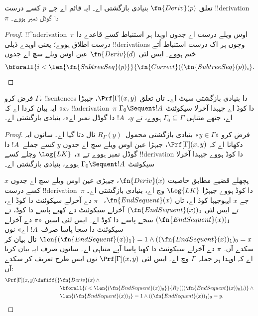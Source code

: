 \documentclass[../../../include/open-logic-section]{subfiles}
\begin{document}
\begin{prop}
تعلق $\fn{Deriv}(p)$ بنیادی بازگشتی اے۔ ایہ قائم اے جے $p$
کسے درست !!{derivation}~$\pi$ دا گوڈل نمبر ہووے۔
\end{prop}

\begin{proof}
!!^a{derivation}~$\pi$
اوس ویلے درست اے
جدوں اوہدا ہر استنباط کسے قاعدے
دا درست اطلاق
ہووے؛ یعنی اوہدے ذیلی !!{derivation}s
وچوں ہر اک
درست استنباط اُتے
ختم ہووے۔ ایس لئی
$\fn{Deriv}(d)$
عین اوس ویلے سچ
اے جدوں
\[
\bforall{i<\len{\fn{SubtreeSeq}(p)}}{\fn{Correct}((\fn{SubtreeSeq}(p))_i}.
\]
\end{proof}

\begin{prop}
فرض کرو $\Gamma$،
!!{sentence}s دا
بنیادی بازگشتی
سیٹ اے۔ تاں تعلق
$\Prf[\Gamma](x, y)$،
جیہڑا ایہ بیان
کردا اے کہ
«$x$،
!!a{derivation}~$\pi$
دا کوڈ اے جیہدا
آخرلا سیکوئنٹ
$\Gamma_0 \Sequent !A$
اے، جتھے متناہی $\Gamma_0 \subseteq \Gamma$
ہووے، تے
$y$،~$!A$ دا
گوڈل نمبر اے»،
بنیادی بازگشتی
اے۔
\end{prop}

\begin{proof}
فرض کرو
«$y \in \Gamma$»
بنیادی بازگشتی
محمول~$R_\Gamma(y)$
نال دتا گیا اے۔
سانوں ایہ دکھانا
اے کہ
$\Prf[\Gamma](x, y)$،
جیہڑا عین اوس
ویلے سچ اے جدوں
$y$ کسے
جملے~$!A$ دا
گوڈل نمبر ہووے
تے $x$، $\Log{LK}$ وچلے کسے !!{derivation} دا کوڈ ہووے جیہدا
آخرلا سیکوئنٹ
$\Gamma_0 \Sequent !A$
ہووے،
بنیادی بازگشتی
اے۔

پچھلے قضیے مطابق خاصیت
$\fn{Deriv}(x)$،
جیہڑی عین اوس
ویلے سچ اے جدوں
$x$ کسے درست
!!{derivation}~$\pi$
دا کوڈ ہووے
جیہڑا $\Log{LK}$
وچ اے،
بنیادی بازگشتی
اے۔ جے $x$
ایہوجیہا کوڈ
اے، تاں
$\fn{EndSequent}(x)$،
~$\pi$ دے
آخرلے سیکوئنٹ
دا کوڈ اے، تے
ایس لئی
$(\fn{EndSequent}(x))_0$
آخرلے سیکوئنٹ
دے کھبے پاسے
دا کوڈ، تے
$(\fn{EndSequent}(x))_1$
سجے پاسے دا
کوڈ اے۔ ایس
لئی اسیں
«$\pi$ دے
آخرلے سیکوئنٹ
دا سجا پاسا
صرف~$!A$ اے»
نوں
$\len{(\fn{EndSequent}(x))_1} = 1 \land ((\fn{EndSequent}(x))_1)_0 =
x$
نال بیان کر
سکدے آں۔
$\pi$ دے
آخرلے سیکوئنٹ
دا کھبا پاسا آپے متناہی اے۔ سانوں صرف ایہ بیان کرنا اے کہ
اوہدا ہر جملہ~$\Gamma$ وچ اے۔ ایس لئی
$\Prf[\Gamma](x, y)$
نوں ایس طرح
تعریف کر سکدے
آں:
\begin{align*}
\Prf[\Gamma](x, y) \defiff {}&
\fn{Deriv}(x) \land {} \\
& \bforall{i <
  \len{(\fn{EndSequent}(x))_0}}{R_\Gamma(((\fn{EndSequent}(x))_0)_i)} \land {}\\
& \len{(\fn{EndSequent}(x))_1} = 1 \land ((\fn{EndSequent}(x))_1)_0 = y.
\end{align*}
\end{proof}
\end{document}

